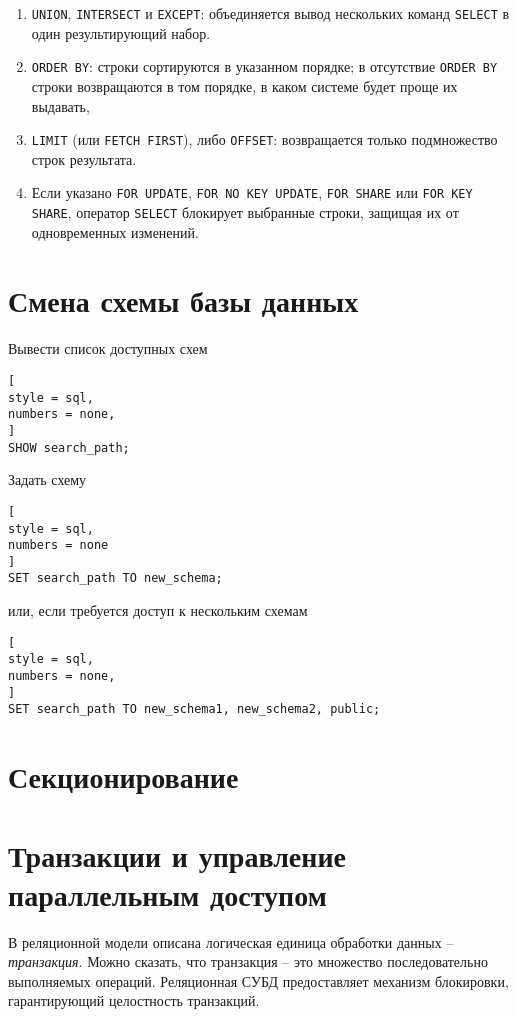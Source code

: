 \documentclass[%
	11pt,
	a4paper,
	utf8,
		]{article}
\begin{document}
\begin{enumerate}
	\item \texttt{UNION}, \texttt{INTERSECT} и \texttt{EXCEPT}: объединяется вывод нескольких команд \texttt{SELECT} в один результирующий набор.
	
	\item \texttt{ORDER BY}: строки сортируются в указанном порядке; в отсутствие \texttt{ORDER BY} строки возвращаются в том порядке, в каком системе будет проще их выдавать,
	
	\item \texttt{LIMIT} (или \texttt{FETCH FIRST}), либо \texttt{OFFSET}: возвращается только подмножество строк результата.
	
	\item Если указано \texttt{FOR UPDATE}, \texttt{FOR NO KEY UPDATE}, \texttt{FOR SHARE} или \texttt{FOR KEY SHARE}, оператор \texttt{SELECT} блокирует выбранные строки, защищая их от одновременных изменений.
\end{enumerate}

\section{Смена схемы базы данных}

Вывести список доступных схем

\begin{lstlisting}[
style = sql,
numbers = none,
]
SHOW search_path;
\end{lstlisting}

Задать схему 

\begin{lstlisting}[
style = sql,
numbers = none
]
SET search_path TO new_schema;
\end{lstlisting}
или, если требуется доступ к нескольким схемам
\begin{lstlisting}[
style = sql,
numbers = none,
]
SET search_path TO new_schema1, new_schema2, public;
\end{lstlisting}

\section{Секционирование}

\section{Транзакции и управление параллельным доступом}

В реляционной модели описана логическая единица обработки данных -- \emph{транзакция}. Можно сказать, что транзакция -- это множество последовательно выполняемых операций. Реляционная СУБД предоставляет механизм блокировки, гарантирующий целостность транзакций.
\end{document}
